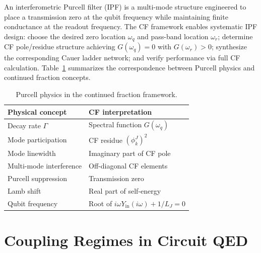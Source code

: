 \documentclass[reprint, floatfix, superscriptaddress, amsmath, amssymb, longbibliography]{revtex4-2}
\begin{document}
An interferometric Purcell filter (IPF) is a multi-mode structure engineered to place a transmission zero at the qubit frequency while maintaining finite conductance at the readout frequency. The CF framework enables systematic IPF design: choose the desired zero location $\omega_q$ and pass-band location $\omega_r$; determine CF pole/residue structure achieving $G(\omega_q) = 0$ with $G(\omega_r) > 0$; synthesize the corresponding Cauer ladder network; and verify performance via full CF calculation. Table~\ref{tab:purcell_cf} summarizes the correspondence between Purcell physics and continued fraction concepts.

\begin{table}[t]
\caption{Purcell physics in the continued fraction framework.}
\label{tab:purcell_cf}
\begin{ruledtabular}
\begin{tabular}{ll}
Physical concept & CF interpretation \\
\midrule
Decay rate $\Gamma$ & Spectral function $G(\omega_q)$ \\
Mode participation & CF residue $(\phi_k^J)^2$ \\
Mode linewidth & Imaginary part of CF pole \\
Multi-mode interference & Off-diagonal CF elements \\
Purcell suppression & Transmission zero \\
Lamb shift & Real part of self-energy \\
Qubit frequency & Root of $i\omega Y_{\mathrm{in}}(i\omega) + 1/L_J = 0$ \\
\end{tabular}
\end{ruledtabular}
\end{table}
\section{Coupling Regimes in Circuit QED}
\label{sec:coupling_regimes}
\end{document}
